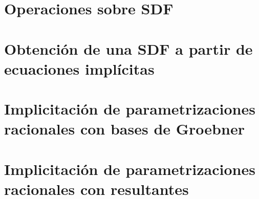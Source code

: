 \section{Operaciones sobre SDF}\label{sec:operaciones}


\section{Obtención de una SDF a partir de ecuaciones implícitas}


\section{Implicitación de parametrizaciones racionales con bases de Groebner}


\section{Implicitación de parametrizaciones racionales con resultantes}





